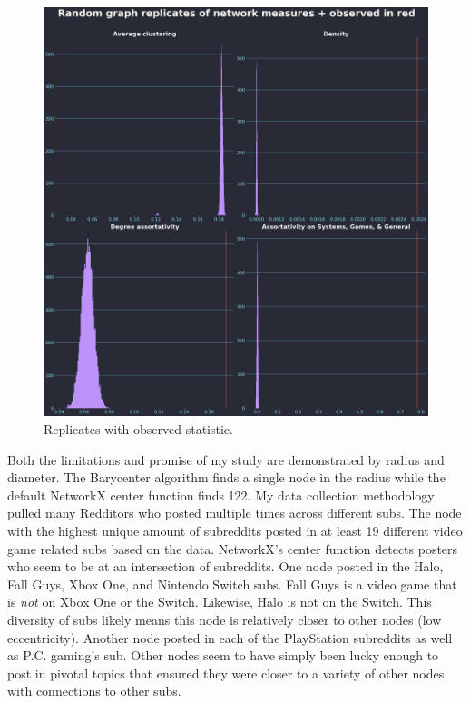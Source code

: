 \documentclass[12pt, a4paper]{article}
\begin{document}
\begin{figure}[ht!]
  \centering
  \includegraphics[width=\textwidth]{metrics_dist_w_obs.png}
  \caption{Replicates with observed statistic.}
  \label{fig:metricwobs}
\end{figure}

Both the limitations and promise of my study are demonstrated by radius and diameter. The Barycenter algorithm finds a single node in the radius while the default NetworkX center function finds 122. My data collection methodology pulled many Redditors who posted multiple times across different subs. The node with the highest unique amount of subreddits posted in at least 19 different video game related subs based on the data. NetworkX's center function detects posters who seem to be at an intersection of subreddits. One node posted in the Halo, Fall Guys, Xbox One, and Nintendo Switch subs. Fall Guys is a video game that is \textit{not} on Xbox One or the Switch. Likewise, Halo is not on the Switch. This diversity of subs likely means this node is relatively closer to other nodes (low eccentricity). Another node posted in each of the PlayStation subreddits as well as P.C. gaming's sub. Other nodes seem to have simply been lucky enough to post in pivotal topics that ensured they were closer to a variety of other nodes with connections to other subs.
\end{document}
